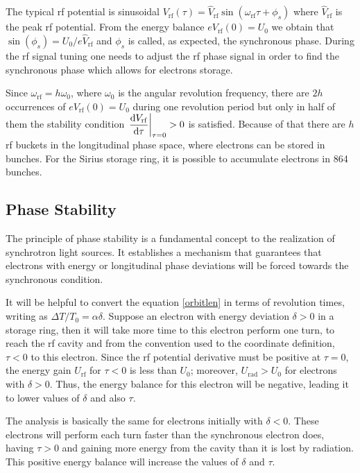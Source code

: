 The typical \gls{rf} potential is sinusoidal $V_{\mathrm{rf}}(\tau) = \hat{V}_{\mathrm{rf}} \sin \left(\omega_{\mathrm{rf}}\tau + \phi_s\right)$ where $\hat{V}_{\mathrm{rf}}$ is the peak \gls{rf} potential. From the energy balance $eV_{\mathrm{rf}}(0) = U_0$ we obtain that $\sin(\phi_s) = U_0/e\hat{V}_{\mathrm{rf}}$ and $\phi_s$ is called, as expected, the synchronous phase. During the \gls{rf} signal tuning one needs to adjust the \gls{rf} phase signal in order to find the synchronous phase which allows for electrons storage.

Since $\omega_{\mathrm{rf}} = h \omega_0$, where $\omega_0$ is the angular revolution frequency, there are $2h$ occurrences of $eV_{\mathrm{rf}}(0) = U_0$ during one revolution period but only in half of them the stability condition $\left.\dfrac{\mathrm{d} V_{\mathrm{rf}}}{\mathrm{d} \tau}\right|_{\tau = 0} > 0$ is satisfied. Because of that there are $h$ \gls{rf} buckets in the longitudinal phase space, where electrons can be stored in bunches. For the Sirius storage ring, it is possible to accumulate electrons in 864 bunches.

\subsection{Phase Stability}

The principle of phase stability is a fundamental concept to the realization of synchrotron light sources. It establishes a mechanism that guarantees that electrons with energy or longitudinal phase deviations will be forced towards the synchronous condition.

It will be helpful to convert the equation \eqref{orbitlen} in terms of revolution times, writing as $\Delta T/T_0 = \alpha \delta$. Suppose an electron with energy deviation $\delta > 0$ in a storage ring, then it will take more time to this electron perform one turn, to reach the \gls{rf} cavity and from the convention used to the coordinate definition, $\tau < 0$ to this electron. Since the \gls{rf} potential derivative must be positive at $\tau = 0$, the energy gain $U_{\mathrm{rf}}$ for $\tau < 0$ is less than $U_0$; moreover, $U_{\mathrm{rad}} > U_0$ for electrons with $\delta > 0$. Thus, the energy balance for this electron will be negative, leading it to lower values of $\delta$ and also $\tau$.

The analysis is basically the same for electrons initially with $\delta < 0$. These electrons will perform each turn faster than the synchronous electron does, having $\tau > 0$ and gaining more energy from the cavity than it is lost by radiation. This positive energy balance will increase the values of $\delta$ and $\tau$.

